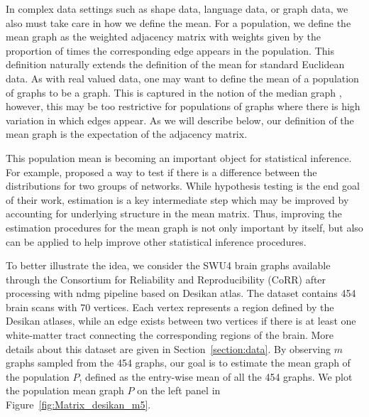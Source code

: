 In complex data settings such as shape data, language data, or graph data, we also must take care in how we define the mean.
For a population, we define the mean graph as the weighted adjacency matrix with weights given by the proportion of times the corresponding edge appears in the population. 
This definition naturally extends the definition of the mean for standard Euclidean data.
As with real valued data, one may want to define the mean of a population of graphs to be a graph.
This is captured in the notion of the median graph \citep{jiang2001median}, however, this may be too restrictive for populations of graphs where there is high variation in which edges appear. 
As we will describe below, our definition of the mean graph is the expectation of the adjacency matrix.

This population mean is becoming an important object for statistical inference.
For example, \citet{ginestet2014hypothesis} proposed a way to test if there is a difference between the distributions for two groups of networks.  
While hypothesis testing is the end goal of their work, estimation is a key intermediate step which may be improved by accounting for underlying structure in the mean matrix. 
Thus, improving the estimation procedures for the mean graph is not only important by itself, but also can be applied to help improve other statistical inference procedures.

To better illustrate the idea, we consider the SWU4 brain graphs available through the Consortium for Reliability and Reproducibility (CoRR) \citep{zuo2014open} after processing with ndmg pipeline \citep{kiar2017science, kiar2016ndmg} based on Desikan atlas.
The dataset contains 454 brain scans with 70 vertices. Each vertex represents a region defined by the Desikan atlases, while an edge exists between two vertices if there is at least one white-matter tract connecting the corresponding regions of the brain. More details about this dataset are given in Section~\ref{section:data}. By observing $m$ graphs sampled from the 454 graphs, our goal is to estimate the mean graph of the population $P$, defined as the entry-wise mean of all the 454 graphs. We plot the population mean graph $P$ on the left panel in Figure~\ref{fig:Matrix_desikan_m5}.


